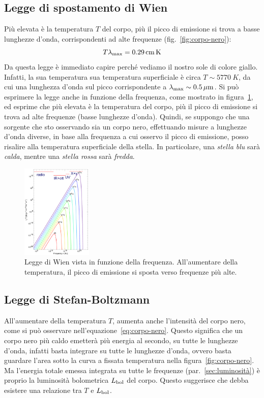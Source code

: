 \subsection{Legge di spostamento di Wien}\label{sec:legge-wien}
Più elevata è la temperatura $T$ del corpo, più il picco di emissione si trova a basse lunghezze d'onda, corrispondenti ad alte frequenze (fig.~\ref{fig:corpo-nero}):
\begin{equation}\label{eq:legge-wien}
    T \lambda_\textup{max} = \SI{0.29}{cm.K}
\end{equation}
Da questa legge è immediato capire perché vediamo il nostro sole di colore giallo. Infatti, la sua temperatura sua temperatura superficiale è circa $T \sim \SI{5770}{K}$, da cui una lunghezza d'onda sul picco corrispondente a $\lambda_\textup{max} \sim \SI{0.5}{\mu m}$. Si può esprimere la legge anche in funzione della frequenza, come mostrato in figura~\ref{fig:legge-wien}, ed esprime che più elevata è la temperatura del corpo, più il picco di emissione si trova ad alte frequenze (basse lunghezze d'onda). Quindi, se suppongo che una sorgente che sto osservando sia un corpo nero, effettuando misure a lunghezze d'onda diverse, in base alla frequenza a cui osservo il picco di emissione, posso risalire alla temperatura superficiale della stella. In particolare, una \emph{stella blu} sarà \emph{calda}, mentre una \emph{stella rossa} sarà \emph{fredda}.

\begin{figure}
\centering
\includegraphics[width=0.3\textwidth]{immagini/legge-wien.png}
\caption{Legge di Wien vista in funzione della frequenza. All'aumentare della temperatura, il picco di emissione si sposta verso frequenze più alte.}
\label{fig:legge-wien}
\end{figure}

\subsection{Legge di Stefan-Boltzmann}\label{sec:legge-stefan-boltzmann}
All'aumentare della temperatura $T$, aumenta anche l'intensità del corpo nero, come si può osservare nell'equazione~\eqref{eq:corpo-nero}. Questo significa che un corpo nero più caldo emetterà più energia al secondo, su tutte le lunghezze d'onda, infatti basta integrare su tutte le lunghezze d'onda, ovvero basta guardare l'area sotto la curva a fissata temperatura nella figura~\ref{fig:corpo-nero}. Ma l'energia totale emessa integrata su tutte le frequenze (par.~\ref{sec:luminosità}) è proprio la luminosità bolometrica $L_\textup{bol}$ del corpo. Questo suggerisce che debba esistere una relazione tra $T$ e $L_\textup{bol}$.

